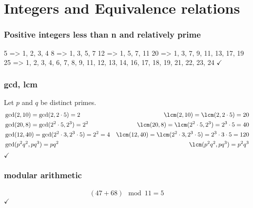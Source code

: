 \section{Integers and Equivalence relations}

\subsubsection{Positive integers less than n and relatively prime}

5 =>  1, 2, 3, 4
8 =>  1, 3, 5, 7
12 => 1, 5, 7, 11
20 => 1, 3, 7, 9, 11, 13, 17, 19
25 => 1, 2, 3, 4, 6, 7, 8, 9, 11, 12, 13, 14, 16, 17, 18, 19, 21, 22, 23, 24
$\checkmark$

\subsubsection{gcd, lcm}

Let $p$ and $q$ be distinct primes.
\begin{align*}
  &\gcd(2, 10) = \gcd(2, 2 \cdot 5)   = 2
  &\lcm(2, 10) = \lcm(2, 2 \cdot 5)  = 20\\
  &\gcd(20, 8) = \gcd(2^2 \cdot 5, 2^3) = 2^2
  &\lcm(20, 8) = \lcm(2^2 \cdot 5, 2^3) = 2^3 \cdot 5 = 40\\
  &\gcd(12, 40) = \gcd(2^2 \cdot 3, 2^3 \cdot 5) = 2^2 = 4
  &\lcm(12, 40) = \lcm(2^2 \cdot 3, 2^3 \cdot 5) = 2^3 \cdot 3 \cdot 5 = 120\\
  &\gcd(p^2q^2, pq^3) = pq^2
  &\lcm(p^2q^2, pq^3) = p^2q^3
\end{align*}
$\checkmark$

\subsubsection{modular arithmetic}
\begin{align*}
  (47 + 68) \mod 11 = 5
\end{align*}
$\checkmark$
